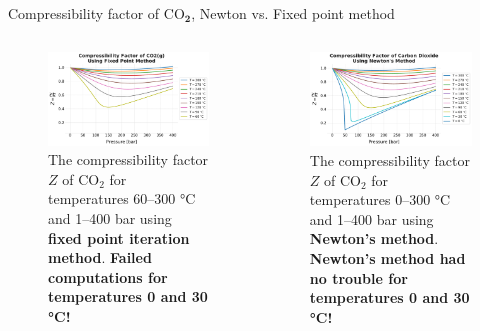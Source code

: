 %
%
\begin{frame}{Compressibility factor of CO$_{\boldsymbol{2}}$, Newton vs. Fixed point method}
\begin{columns}[t]


\begin{figure}
\centering
\includegraphics[width=1.05\columnwidth]{figures/activity-models/co2-compressibility-factor-fixed-point}
\caption{The compressibility factor $Z$ of CO$_{2}$ for temperatures
60–300 °C and 1–400 bar using \textbf{fixed point iteration method}.
\alert{\textbf{Failed computations for temperatures 0 and 30 °C!}}}
\end{figure}


\begin{figure}
\centering
\includegraphics[width=1.05\columnwidth]{figures/activity-models/co2-compressibility-factor-newton}
\caption{The compressibility factor $Z$ of CO$_{2}$ for temperatures
0–300 °C and 1–400 bar using \textbf{Newton's method}. 
\alert{\textbf{Newton's method had no trouble for temperatures 0 and 30 °C!}}}
\end{figure}

\end{columns}
\end{frame}
